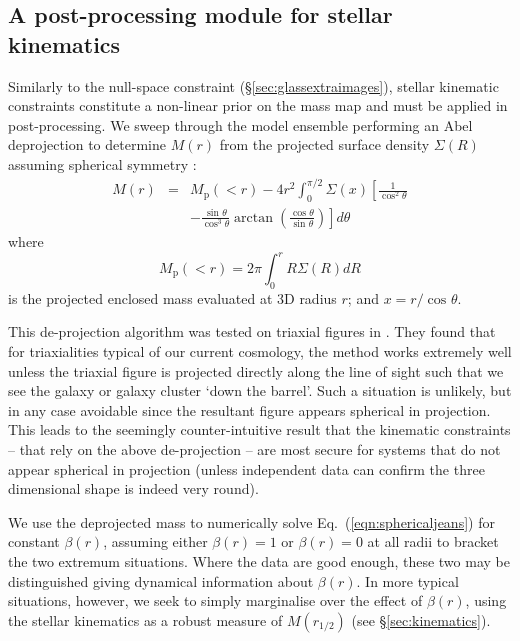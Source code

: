 \documentclass[galley,usenatbib]{mn2e}
\newcommand{\Mddd}{\ensuremath{M}}
\newcommand{\eqnref}[1] {Eq.~(\ref{#1})}
\newcommand{\secref}[1] {\S\ref{#1}}
\newcommand{\cth}[1][]{\cos^{#1}\theta}
\newcommand{\sth}[1][]{\sin^{#1}\theta}
\def\dth{d\theta}
\begin{document}
\subsection{A post-processing module for stellar kinematics}\label{sec:glasskinematics} 
Similarly to the null-space constraint (\secref{sec:glassextraimages}), stellar
kinematic constraints constitute a non-linear prior on the mass map and must be
applied in post-processing. We sweep through the model ensemble performing an
Abel deprojection to determine $\Mddd(r)$ from the projected surface density
$\Sigma(R)$ assuming spherical symmetry
\citep[e.g.][]{2008gady.book.....B,2008MNRAS.390.1647B}: 
%
\begin{eqnarray} 
    \Mddd(r) & = & M_\mathrm{p}(<r) - 4r^2 \int_0^{\pi/2} \Sigma\left(x\right) \left[\frac{1}{\cth[2]} \right. \nonumber \\ 
    & & \left. - \frac{\sth}{\cth[3]} \arctan\left(\frac{\cth}{\sth}\right) \right] \dth
\end{eqnarray}
%
where 
%
\begin{equation}
    M_\mathrm{p}(<r) = 2\pi \int_0^r R \Sigma(R) dR
\end{equation}
%
is the projected enclosed mass evaluated at 3D radius $r$; and $x = r/\cth$. 

This de-projection algorithm was tested on triaxial figures in
\citet{2006ApJ...652L...5S}. They found that for triaxialities typical of our
current cosmology, the method works extremely well unless the triaxial figure
is projected directly along the line of sight such that we see the galaxy or
galaxy cluster `down the barrel'. Such a situation is unlikely, but in any case
avoidable since the resultant figure appears spherical in projection. This
leads to the seemingly counter-intuitive result that the kinematic constraints
-- that rely on the above de-projection -- are most secure for systems that do
not appear spherical in projection (unless independent data can confirm the
three dimensional shape is indeed very round). 

We use the deprojected mass to numerically solve \eqnref{eqn:sphericaljeans}
for constant $\beta(r)$, assuming either $\beta(r) = 1$ or $\beta(r) = 0$ at
all radii to bracket the two extremum situations. Where the data are good
enough, these two may be distinguished giving dynamical information about
$\beta(r)$. In more typical situations, however, we seek to simply marginalise
over the effect of $\beta(r)$, using the stellar kinematics as a robust measure
of $\Mddd(r_{1/2})$ (see \secref{sec:kinematics}). 
\end{document}

